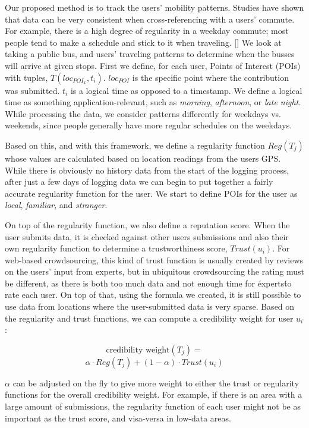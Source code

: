\documentclass[9pt,twocolumn]{article}
\begin{document}
	Our proposed method is to track the users' mobility patterns. Studies have shown that data can be very consistent when cross-referencing with a users' commute. For example, there is a high degree of regularity in a weekday commute; most people tend to make a schedule and stick to it when traveling. [] %
	We look at taking a public bus, and users' traveling patterns to determine when the busses will arrive at given stops. First we define, for each user, Points of Interest (POIs) with tuples, $T(loc_{POI_x}, t_i)$. $loc_{POI}$ is the specific point where the contribution was submitted. $t_i$ is a logical time as opposed to a timestamp. We define a logical time as something application-relevant, such as \emph{morning}, \emph{afternoon}, or \emph{late night}.
	While processing the data, we consider patterns differently for weekdays vs. weekends, since people generally have more regular schedules on the weekdays. %
	
	Based on this, and with this framework, we define a regularity function $Reg(T_j)$ whose values are calculated based on location readings from the users GPS.
	While there is obviously no history data from the start of the logging process, after just a few days of logging data we can begin to put together a fairly accurate regularity function for the user. We start to define POIs for the user as \emph{local}, \emph{familiar}, and \emph{stranger}. 
	
	On top of the regularity function, we also define a reputation score. When the user submits data, it is checked against other users submissions and also their own regularity function to determine a trustworthiness score, $Trust(u_i)$. For web-based crowdsourcing, this kind of trust function is usually created by reviews on the users' input from experts, but in ubiquitous crowdsourcing the rating must be different, as there is both too much data and not enough time for \'experts\' to rate each user. On top of that, using the formula we created, it is still possible to use data from locations where the user-submitted data is very sparse. Based on the regularity and trust functions, we can compute a credibility weight for user $u_i$:
	
	$$\text{credibility weight} (T_j) = $$ 
	$$\alpha \cdot Reg(T_j) + (1 - \alpha) \cdot Trust(u_i)$$
	
	$\alpha$ can be adjusted on the fly to give more weight to either the trust or regularity functions for the overall credibility weight. For example, if there is an area with a large amount of submissions, the regularity function of each user might not be as important as the trust score, and visa-versa in low-data areas.
	
\end{document}
